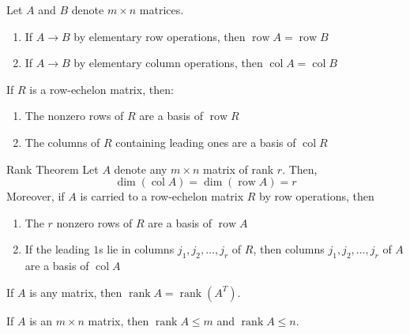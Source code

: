 \documentclass[12pt]{article}
\begin{document}
\begin{lemma}{}{}
    Let $ A $ and $ B $ denote $ m \times n $ matrices.
    \begin{enumerate}
        \item If $ A \to B $ by elementary row operations, then $ \operatorname{row} A = \operatorname{row} B $
        \item If $ A \to B $ by elementary column operations, then $ \operatorname{col} A = \operatorname{col} B $
    \end{enumerate}
\end{lemma}

\begin{lemma}{}{}
    If $ R $ is a row-echelon matrix, then:
    \begin{enumerate}
        \item The nonzero rows of $ R $ are a basis of $ \operatorname{row} R $
        \item The columns of $ R $ containing leading ones are a basis of $ \operatorname{col} R $
    \end{enumerate}
\end{lemma}

\begin{theorem}{Rank Theorem}{}
    Let $ A $ denote any $ m \times n $ matrix of rank $ r $. Then,
    \[ \dim \left( \operatorname{col} A \right) = \dim \left( \operatorname{row} A \right) = r \]
    Moreover, if $ A $ is carried to a row-echelon matrix $ R $ by row operations, then
    \begin{enumerate}
        \item The $ r $ nonzero rows of $ R $ are a basis of $ \operatorname{row} A $
        \item If the leading $ 1 $s lie in columns $ j_1, j_2, \dots, j_r $ of $ R $, then columns $ j_1, j_2, \dots, j_r $ of $ A $ are a basis of $ \operatorname{col} A $
    \end{enumerate}
\end{theorem}

\begin{corollary}{}{}
    If $ A $ is any matrix, then $ \operatorname{rank} A = \operatorname{rank} \left( A^T \right) $.
\end{corollary}

\begin{corollary}{}{}
    If $ A $ is an $ m \times n $ matrix, then $ \operatorname{rank} A \leq m $ and $ \operatorname{rank} A \leq n $.
\end{corollary}
\end{document}
